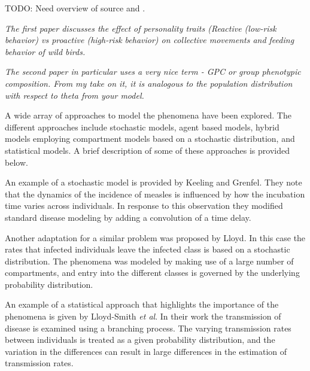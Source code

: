 \documentclass[12pt]{article}
\begin{document}

TODO: Need overview of source \cite{doi:10.1098/rspb.2014.1016} and
\cite{FARINE2015609}.

\textit{The first paper\cite{doi:10.1098/rspb.2014.1016} discusses the effect of personality traits (Reactive (low-risk behavior) vs proactive (high-risk behavior) on collective movements and feeding behavior of wild birds. }

\textit{The second paper\cite{FARINE2015609} in particular uses a very nice term - GPC or group phenotypic composition. From my take on it, it is analogous to the population distribution with respect to theta from your model.}

A wide array of approaches to model the phenomena have been
explored. The different approaches include stochastic
models\cite{Keeling65}, agent based models\cite{doi:10.1086/687235},
hybrid models employing compartment models based on a stochastic
distribution\cite{doi:10.1098/rspb.2001.1599}, and statistical
models\cite{SuperspreadingLloyd}. A brief description of some of these
approaches is provided below.

An example of a stochastic model is provided by Keeling and
Grenfel\cite{Keeling65}. They note that the dynamics of the incidence
of measles is influenced by how the incubation time varies across
individuals. In response to this observation they modified standard
disease modeling by adding a convolution of a time delay.


Another adaptation for a similar problem was proposed by
Lloyd\cite{doi:10.1098/rspb.2001.1599}. In this case the rates that
infected individuals leave the infected class is based on a stochastic
distribution. The phenomena was modeled by making use of a large
number of compartments, and entry into the different classes is
governed by the underlying probability distribution.

An example of a statistical approach that highlights the importance of
the phenomena is given by Lloyd-Smith \textit{et
  al}\cite{SuperspreadingLloyd}. In their work the transmission of
disease is examined using a branching process. The varying
transmission rates between individuals is treated as a given
probability distribution, and the variation in the differences can
result in large differences in the estimation of transmission rates.
\end{document}

